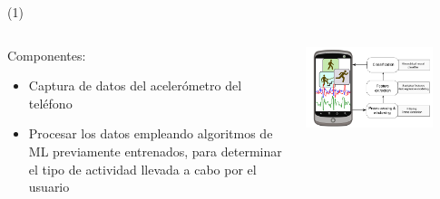 


\begin{frame}{ \footnotemark (1) }
\begin{columns}
\begin{column}{0.4\textwidth}
		Componentes:
		\begin{itemize}
		\item Captura de datos del acelerómetro del teléfono
		\item Procesar los datos empleando algoritmos de ML previamente entrenados, para determinar el tipo de actividad llevada a cabo por el usuario
		\end{itemize}
\end{column}
\begin{column}{0.6\textwidth}  
    \begin{center}
     \includegraphics[width=0.8\textwidth]{Figs/DeteccionActividad1}
     \end{center}
\end{column}
\end{columns}
\setcounter{footnote}{0}
\end{frame}


